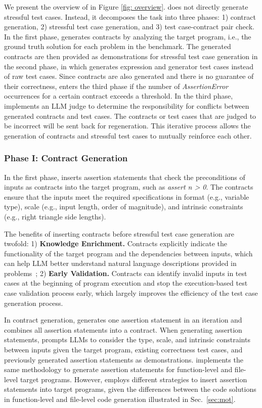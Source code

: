 We present the overview of \tool in Figure \ref{fig: overview}. \tool does not directly generate stressful test cases. Instead, it decomposes the task into three phases: 1) contract generation, 2) stressful test case generation, and 3) test case-contract pair check. In the first phase, \tool generates contracts by analyzing the target program, i.e., the ground truth solution for each problem in the benchmark. The generated contracts are then provided as demonstrations for stressful test case generation in the second phase, in which \tool generates expression and generator test cases instead of raw test cases. Since contracts are also generated and there is no guarantee of their correctness, \tool enters the third phase if the number of \textit{AssertionError} occurrences for a certain contract exceeds a threshold. In the third phase, \tool implements an LLM judge to determine the responsibility for conflicts between generated contracts and test cases. The contracts or test cases that are judged to be incorrect will be sent back for regeneration. This iterative process allows the generation of contracts and stressful test cases to mutually reinforce each other.

\subsubsection{Phase I: Contract Generation}\label{sec:contract}
In the first phase, \tool inserts assertion statements that check the preconditions of inputs as contracts into the target program, such as \textit{assert n > 0}. The contracts ensure that the inputs meet the required specifications in format (e.g., variable type), scale (e.g., input length, order of magnitude), and intrinsic constraints (e.g., right triangle side lengths).

The benefits of inserting contracts before stressful test case generation are twofold: 1) \textbf{Knowledge Enrichment.} Contracts explicitly indicate the functionality of the target program and the dependencies between inputs, which can help LLM better understand natural language descriptions provided in problems~\cite{liu2023is,endres2024can}; 2) \textbf{Early Validation.} Contracts can identify invalid inputs in test cases at the beginning of program execution and stop the execution-based test case validation process early, which largely improves the efficiency of the test case generation process.

In contract generation, \tool generates one assertion statement in an iteration and combines all assertion statements into a contract. When generating assertion statements, \tool prompts LLMs to consider the type, scale, and intrinsic constraints between inputs given the target program, existing correctness test cases, and previously generated assertion statements as demonstrations. \tool implements the same methodology to generate assertion statements for function-level and file-level target programs. However, \tool employs different strategies to insert assertion statements into target programs, given the differences between the code solutions in function-level and file-level code generation illustrated in Sec.~\ref{sec:mot}.

